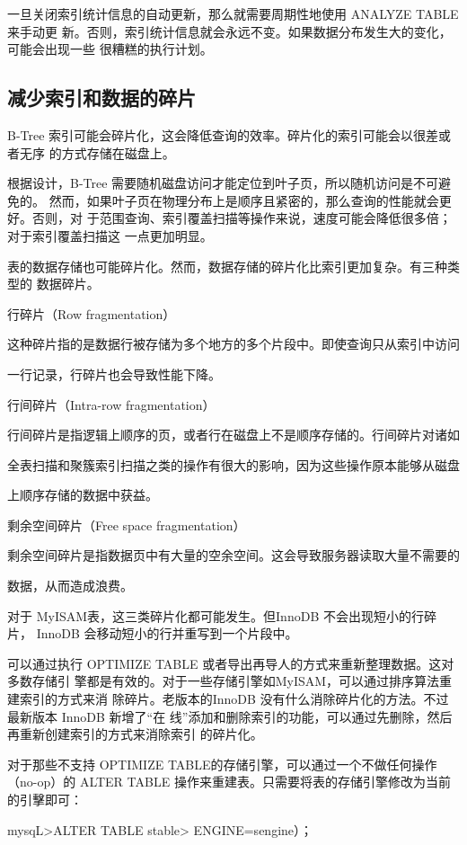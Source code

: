 一旦关闭索引统计信息的自动更新，那么就需要周期性地使用 ANALYZE TABLE 来手动更
新。否则，索引统计信息就会永远不变。如果数据分布发生大的变化，可能会出现一些
很糟糕的执行计划。

\subsection{减少索引和数据的碎片}
B-Tree 索引可能会碎片化，这会降低查询的效率。碎片化的索引可能会以很差或者无序
的方式存储在磁盘上。

根据设计，B-Tree 需要随机磁盘访问才能定位到叶子页，所以随机访问是不可避免的。
然而，如果叶子页在物理分布上是顺序且紧密的，那么查询的性能就会更好。否则，对
于范围查询、索引覆盖扫描等操作来说，速度可能会降低很多倍；对于索引覆盖扫描这
一点更加明显。

表的数据存储也可能碎片化。然而，数据存储的碎片化比索引更加复杂。有三种类型的
数据碎片。

行碎片（Row fragmentation）

这种碎片指的是数据行被存储为多个地方的多个片段中。即使查询只从索引中访问

一行记录，行碎片也会导致性能下降。

行间碎片（Intra-row fragmentation）

行间碎片是指逻辑上顺序的页，或者行在磁盘上不是顺序存储的。行间碎片对诸如

全表扫描和聚簇索引扫描之类的操作有很大的影响，因为这些操作原本能够从磁盘

上顺序存储的数据中获益。

剩余空间碎片（Free space fragmentation）

剩余空间碎片是指数据页中有大量的空余空间。这会导致服务器读取大量不需要的

数据，从而造成浪费。

对于 MyISAM表，这三类碎片化都可能发生。但InnoDB 不会出现短小的行碎片，
InnoDB 会移动短小的行并重写到一个片段中。

可以通过执行 OPTIMIZE TABLE 或者导出再导人的方式来重新整理数据。这对多数存储引
擎都是有效的。对于一些存储引擎如MyISAM，可以通过排序算法重建索引的方式来消
除碎片。老版本的InnoDB 没有什么消除碎片化的方法。不过最新版本 InnoDB 新增了“在
线”添加和删除索引的功能，可以通过先删除，然后再重新创建索引的方式来消除索引
的碎片化。

对于那些不支持 OPTIMIZE TABLE的存储引擎，可以通过一个不做任何操作（no-op）的
ALTER TABLE 操作来重建表。只需要将表的存储引擎修改为当前的引擊即可：

mysqL>ALTER TABLE stable> ENGINE=sengine）；

